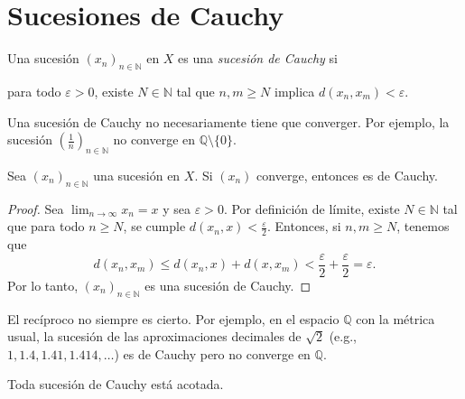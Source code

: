 \section{Sucesiones de Cauchy}

\begin{definition}
	Una sucesión $(x_n)_{n \in \mathbb{N}}$ en $X$ es una \emph{sucesión de Cauchy} si
	\begin{center}
		\begin{minipage}{0.9\linewidth}
			para todo $\varepsilon > 0$, existe $N \in \mathbb{N}$ tal que $n, m \geq N$ implica $d(x_n, x_m) < \varepsilon$.
		\end{minipage}
	\end{center}
\end{definition}

\begin{remark}
	Una sucesión de Cauchy no necesariamente tiene que converger. Por ejemplo, la sucesión $(\frac{1}{n})_{n \in \mathbb{N}}$ no converge en $\mathbb{Q} \setminus \{ 0 \}$.
\end{remark}

\begin{proposition}
	Sea $(x_n)_{n \in \mathbb{N}}$ una sucesión en $X$. Si $(x_n)$ converge, entonces es de Cauchy.
\end{proposition}

\begin{proof}
	Sea $\lim_{n \to \infty} x_n = x$ y sea $\varepsilon > 0$. Por definición de límite, existe $N \in \mathbb{N}$ tal que para todo $n \geq N$, se cumple $d(x_n, x) < \frac{\varepsilon}{2}$. Entonces, si $n, m \geq N$, tenemos que
	$$
		d(x_n, x_m) \leq d(x_n, x) + d(x, x_m) < \frac{\varepsilon}{2} + \frac{\varepsilon}{2} = \varepsilon.
	$$
	Por lo tanto, $(x_n)_{n \in \mathbb{N}}$ es una sucesión de Cauchy.
\end{proof}

\begin{remark}
	El recíproco no siempre es cierto. Por ejemplo, en el espacio $\mathbb{Q}$ con la métrica usual, la sucesión de las aproximaciones decimales de $\sqrt{2}$ (e.g., $1, 1.4, 1.41, 1.414, \dots$) es de Cauchy pero no converge en $\mathbb{Q}$.
\end{remark}
\begin{proposition}
	Toda sucesión de Cauchy está acotada.
\end{proposition}

